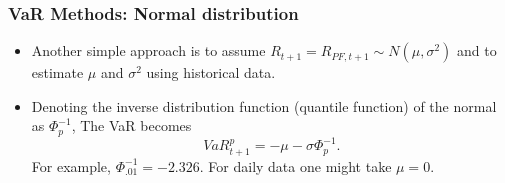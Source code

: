 \begin{frame}%

\frametitle{VaR Methods: Normal distribution}
\begin{itemize}
\item Another simple approach is to
assume $R_{t+1}=R_{PF,t+1}\sim N(\mu ,\sigma ^{2})$ and to estimate $\mu $
and $\sigma ^{2}$ using historical data.

\item Denoting the inverse distribution function (quantile function) of the normal as $\Phi _{p}^{-1}$, The VaR becomes
\begin{equation*}
VaR_{t+1}^{p}=-\mu -\sigma \Phi _{p}^{-1}.
\end{equation*}%
For example, $\Phi _{.01}^{-1}=-2.326$. For daily data one might take $\mu =0$.
\end{itemize}

\end{frame}%
